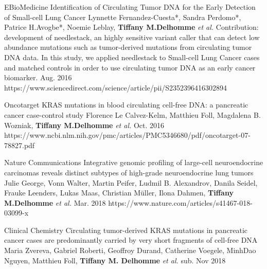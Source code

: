 \begin{cventries}
  \cvpublicationentry
    {EBioMedicine} %
    {Identification of Circulating Tumor DNA for the Early Detection of Small-cell Lung Cancer} %
    {Lynnette Fernandez-Cuesta*, Sandra Perdomo*, Patrice H.Avogbe*, Noemie Leblay, \textbf{Tiffany M.Delhomme} \textit{et al.}} %
    {Contribution: development of needlestack, an highly sensitive variant caller that can detect low abundance mutations such as tumor-derived mutations from circulating tumor DNA data. In this study, we applied needlestack to Small-cell Lung Cancer cases and matched controls in order to use circulating tumor DNA as an early cancer biomarker. }
    {Aug. 2016} %
    {https://www.sciencedirect.com/science/article/pii/S2352396416302894}

  \cvpublicationentry
    {Oncotarget} %
    {KRAS mutations in blood circulating cell-free DNA: a pancreatic
cancer case-control study} %
    {Florence Le Calvez-Kelm, Matthieu Foll, Magdalena B. Wozniak, \textbf{Tiffany M.Delhomme} \textit{et al.}} %
    {}
    {Oct. 2016} %
    {https://www.ncbi.nlm.nih.gov/pmc/articles/PMC5346680/pdf/oncotarget-07-78827.pdf}

  \cvpublicationentry
    {Nature Communications} %
    {Integrative genomic profiling of large-cell neuroendocrine carcinomas reveals distinct subtypes of high-grade neuroendocrine lung tumors} %
    {Julie George, Vonn Walter, Martin Peifer, Ludmil B. Alexandrov, Danila Seidel, Frauke Leenders, Lukas Maas, Christian Müller, Ilona Dahmen, \textbf{Tiffany M.Delhomme} \textit{et al.}} %
    {}
    {Mar. 2018} %
    {https://www.nature.com/articles/s41467-018-03099-x}


	\cvpublicationentry
    {Clinical Chemistry} %
    {Circulating tumor-derived KRAS mutations in pancreatic cancer cases are predominantly carried by very short fragments of cell-free DNA} %
    {Maria Zvereva, Gabriel Roberti, Geoffroy Durand, Catherine Voegele, MinhDao Nguyen, Matthieu Foll, \textbf{Tiffany M. Delhomme} \textit{et al.}} %
    {}
    {sub. Nov 2018} %
    {}


\end{cventries}
